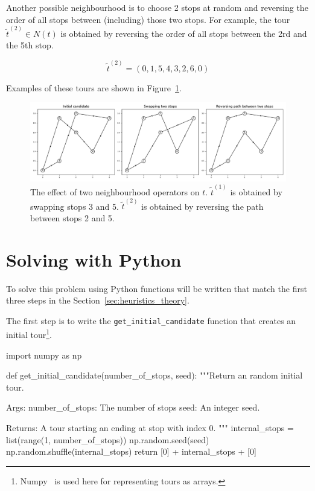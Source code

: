 Another possible neighbourhood is to choose 2 stops at random and reversing the
order of all stops between (including) those two stops. For example, the tour
\(\tilde t^{(2)} \in N(t)\) is obtained by reversing the order of all stops between
the 2rd and the 5th stop.

\[
    \tilde t^{(2)} = (0, 1, 5, 4, 3, 2, 6, 0)
\]

Examples of these tours are shown in
Figure~\ref{fig:tsp-effect-of-neighbourhood-operators}.

\begin{figure}[!hbtp]
    \begin{center}
        \includegraphics[width=\textwidth]{./assets/tsp-effect-of-neighbourhood-operators/main.pdf}
    \end{center}
    \caption{The effect of two neighbourhood operators on \(t\). \(\tilde t^{(1)}\) is
    obtained by swapping stops 3 and 5. \(\tilde t^{(2)}\) is obtained by reversing the
    path between stops 2 and 5.}
    \label{fig:tsp-effect-of-neighbourhood-operators}
\end{figure}

\section{Solving with Python}\label{sec:heuristics_solving-with-python}

To solve this problem using Python functions will be written that match the
first three steps in the Section~\ref{sec:heuristics_theory}.

The first step is to write the \texttt{get_initial_candidate}
function that creates an initial tour\footnote{Numpy~\cite{harris2020array}
is used here for representing tours as arrays.}.

\begin{pyin}
import numpy as np


def get_initial_candidate(number_of_stops, seed):
    """Return an random initial tour.

    Args:
        number_of_stops: The number of stops
        seed: An integer seed.

    Returns:
        A tour starting an ending at stop with index 0.
    """
    internal_stops = list(range(1, number_of_stops))
    np.random.seed(seed)
    np.random.shuffle(internal_stops)
    return [0] + internal_stops + [0]
\end{pyin}

